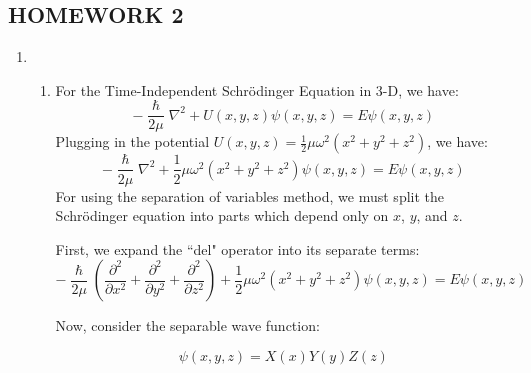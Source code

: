 \documentclass[10pt]{article}
\begin{document}

\begin{centering}
  \section*{HOMEWORK 2}
\end{centering}

\begin{enumerate}
  \item 
  \begin{enumerate}
    \item For the Time-Independent Schr{\"o}dinger Equation in 3-D, we have:
    \begin{equation*}
      - \frac{\hslash}{2 \mu} \nabla ^2 + U \left( x,y,z \right) \psi \left( x,y,z \right) = E \psi \left( x,y,z \right)
    \end{equation*}
    Plugging in the potential $ U \left( x,y,z \right) = \frac{1}{2} \mu \omega ^2 \left( x^2+y^2+z^2 \right) $, we have:
    \begin{equation*}
      - \frac{\hslash}{2 \mu} \nabla ^2 + \frac{1}{2} \mu \omega ^2 \left( x^2+y^2+z^2 \right)  \psi \left( x,y,z \right) = E \psi \left( x,y,z \right)
    \end{equation*}
    For using the separation of variables method, we must split the Schr{\"o}dinger equation into parts which depend only on $ x $, $ y $, and $ z $.

    First, we expand the ``del" operator into its separate terms:
    \begin{equation*}
      - \frac{\hslash}{2 \mu} \left( \frac{\partial^2 }{\partial x^2}+\frac{\partial ^2}{\partial y^2} + \frac{\partial ^2}{\partial z^2} \right) + \frac{1}{2} \mu \omega ^2 \left( x^2+y^2+z^2 \right)  \psi \left( x,y,z \right) = E \psi \left( x,y,z \right)
    \end{equation*}

    Now, consider the separable wave function:
    
    \begin{equation*}
      \psi \left( x,y,z \right) = X \left( x \right) Y \left( y \right) Z \left( z \right)
    \end{equation*}


\end{enumerate}
\end{enumerate}
\end{document}

